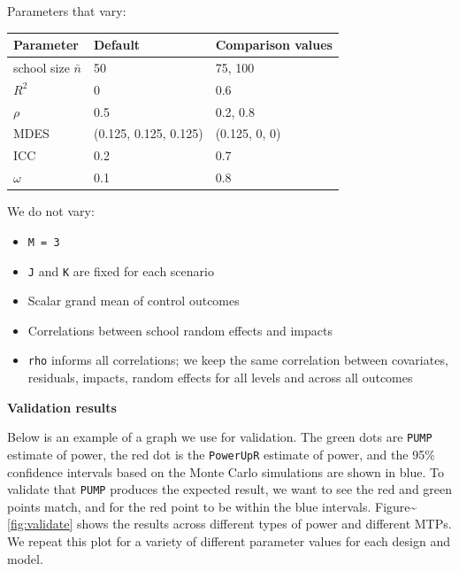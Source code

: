 \documentclass[
]{article}
\providecommand{\tightlist}{%
  \setlength{\itemsep}{0pt}\setlength{\parskip}{0pt}}
\begin{document}
Parameters that vary:

\begin{tabular}{l l l}
Parameter               & Default                & Comparison values \\ \hline
school size $\bar{n}$   & 50                     & 75, 100           \\
$R^2$                   & 0                      & 0.6               \\
$\rho$                  & 0.5                    & 0.2, 0.8          \\
MDES                    & (0.125, 0.125, 0.125)  & (0.125, 0, 0)     \\
ICC                     & 0.2                    & 0.7               \\
$\omega$                & 0.1                    & 0.8               \\
\end{tabular}

We do not vary:

\begin{itemize}
\tightlist
\item
  \texttt{M\ =\ 3}
\item
  \texttt{J} and \texttt{K} are fixed for each scenario
\item
  Scalar grand mean of control outcomes
\item
  Correlations between school random effects and impacts
\item
  \texttt{rho} informs all correlations; we keep the same correlation
  between covariates, residuals, impacts, random effects for all levels
  and across all outcomes
\end{itemize}

\textbf{Validation results}

Below is an example of a graph we use for validation. The green dots are
\texttt{PUMP} estimate of power, the red dot is the \texttt{PowerUpR}
estimate of power, and the 95\% confidence intervals based on the Monte
Carlo simulations are shown in blue. To validate that \texttt{PUMP}
produces the expected result, we want to see the red and green points
match, and for the red point to be within the blue intervals.
Figure\textasciitilde{}\ref{fig:validate} shows the results across
different types of power and different MTPs. We repeat this plot for a
variety of different parameter values for each design and model.
\end{document}
